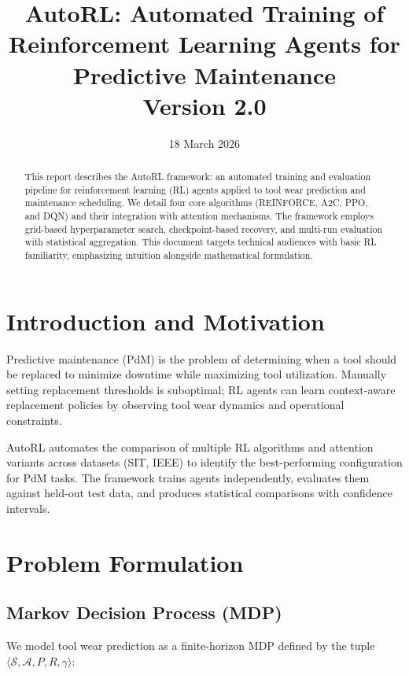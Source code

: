 \documentclass[11pt]{article}
\title{AutoRL: Automated Training of Reinforcement Learning Agents for Predictive Maintenance \\ \Large Version 2.0}
\author{}
\date{18 March 2026}
\begin{document}
\maketitle

\begin{abstract}
This report describes the AutoRL framework: an automated training and evaluation pipeline for reinforcement learning (RL) agents applied to tool wear prediction and maintenance scheduling. We detail four core algorithms (REINFORCE, A2C, PPO, and DQN) and their integration with attention mechanisms. The framework employs grid-based hyperparameter search, checkpoint-based recovery, and multi-run evaluation with statistical aggregation. This document targets technical audiences with basic RL familiarity, emphasizing intuition alongside mathematical formulation.
\end{abstract}

\section{Introduction and Motivation}
Predictive maintenance (PdM) is the problem of determining when a tool should be replaced to minimize downtime while maximizing tool utilization. Manually setting replacement thresholds is suboptimal; RL agents can learn context-aware replacement policies by observing tool wear dynamics and operational constraints.

AutoRL automates the comparison of multiple RL algorithms and attention variants across datasets (SIT, IEEE) to identify the best-performing configuration for PdM tasks. The framework trains agents independently, evaluates them against held-out test data, and produces statistical comparisons with confidence intervals.

\section{Problem Formulation}

\subsection{Markov Decision Process (MDP)}
We model tool wear prediction as a finite-horizon MDP defined by the tuple $\langle \mathcal{S}, \mathcal{A}, P, R, \gamma \rangle$:
\end{document}
